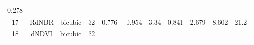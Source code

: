 \documentclass[twoside,12pt,final]{ucthesis-CA2012}
\begin{document}
\begin{ucmainmatter}
\begin{longtable}[]{@{}ccccccccccc@{}}
\begin{minipage}[t]{0.05\columnwidth}
0.278\strut
\end{minipage}\tabularnewline
\begin{minipage}[t]{0.04\columnwidth}\centering\strut
17\strut
\end{minipage} & \begin{minipage}[t]{0.11\columnwidth}\centering\strut
RdNBR\strut
\end{minipage} & \begin{minipage}[t]{0.06\columnwidth}\centering\strut
bicubic\strut
\end{minipage} & \begin{minipage}[t]{0.08\columnwidth}\centering\strut
32\strut
\end{minipage} & \begin{minipage}[t]{0.08\columnwidth}\centering\strut
0.776\strut
\end{minipage} & \begin{minipage}[t]{0.07\columnwidth}\centering\strut
-0.954\strut
\end{minipage} & \begin{minipage}[t]{0.07\columnwidth}\centering\strut
3.34\strut
\end{minipage} & \begin{minipage}[t]{0.07\columnwidth}\centering\strut
0.841\strut
\end{minipage} & \begin{minipage}[t]{0.05\columnwidth}\centering\strut
2.679\strut
\end{minipage} & \begin{minipage}[t]{0.05\columnwidth}\centering\strut
8.602\strut
\end{minipage} & \begin{minipage}[t]{0.05\columnwidth}\centering\strut
21.2\strut
\end{minipage}\tabularnewline
\begin{minipage}[t]{0.04\columnwidth}\centering\strut
18\strut
\end{minipage} & \begin{minipage}[t]{0.11\columnwidth}\centering\strut
dNDVI\strut
\end{minipage} & \begin{minipage}[t]{0.06\columnwidth}\centering\strut
bicubic\strut
\end{minipage} & \begin{minipage}[t]{0.08\columnwidth}\centering\strut
32\strut
\end{minipage} & \begin{minipage}[t]{0.08\columnwidth}\centering\strut

\end{minipage}
\end{longtable}
\end{ucmainmatter}
\end{document}
